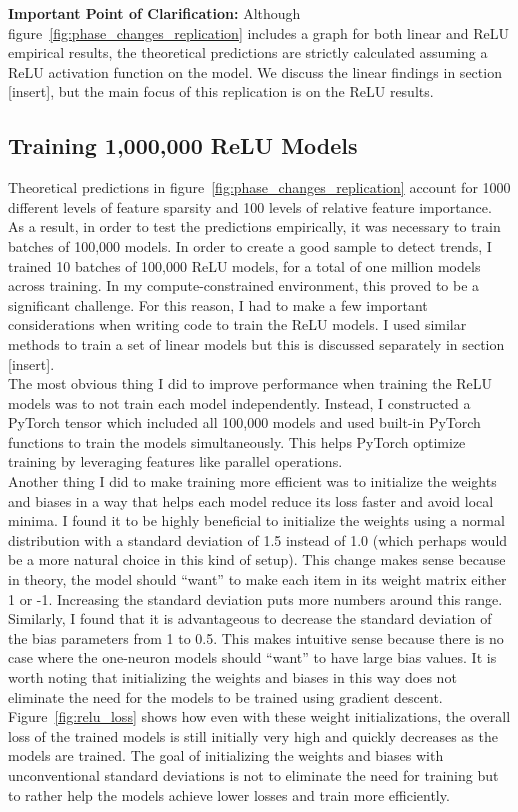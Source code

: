\documentclass{article} %
\begin{document}
\textbf{Important Point of Clarification:} Although 
figure~\ref{fig:phase_changes_replication} includes a graph for both linear and ReLU
empirical results, the theoretical predictions are strictly calculated assuming
a ReLU activation function on the model. We discuss the linear findings in section
[insert], but the main focus of this replication is on the ReLU results.

\subsection{Training 1,000,000 ReLU Models}

Theoretical predictions in figure~\ref{fig:phase_changes_replication} account
for 1000 different levels of feature sparsity and 100 levels of relative feature
importance. As a result, in order to test the predictions empirically, it was
necessary to train batches of 100,000 models. In order to create a good sample
to detect trends, I trained 10 batches of 100,000 ReLU models, for a total of one million
models across training. In my compute-constrained environment,
this proved to be a significant challenge. For this reason, I had to make a few
important considerations when writing code to train the ReLU models. I used 
similar methods to train a set of linear models but this is discussed separately
in section [insert].\\

The most obvious thing I did to improve performance when training the 
ReLU models was to not train each model independently. Instead, I constructed a 
PyTorch tensor which included all 100,000 models and used built-in PyTorch functions 
to train the models simultaneously. This helps PyTorch optimize training by 
leveraging features like parallel operations. \\

Another thing I did to make training more efficient was to initialize the weights and
biases in a way that helps each model reduce its loss faster and avoid local minima.
I found it to be highly beneficial to initialize the weights using a normal 
distribution with a standard deviation of 1.5 instead of
1.0 (which perhaps would be a more natural choice in this kind of setup). This change
makes sense because 
in theory, the model should ``want'' to make each item in its weight matrix
either 1 or -1. Increasing the standard deviation puts more numbers around this range.
Similarly, I found that it is advantageous to decrease the standard deviation of the
bias parameters from 1 to 0.5. This makes intuitive sense because
there is no case where the one-neuron models should ``want'' to have large bias values.
It is worth noting that initializing the weights and biases in this way does
not eliminate the need for the models to be trained using gradient descent.
Figure~\ref{fig:relu_loss} shows how even with these weight initializations, the
overall loss of the trained models is still initially very high and quickly
decreases as the models are trained. The goal of initializing the weights and biases
with unconventional standard deviations is not to eliminate the need for training
but to rather help the models achieve lower losses and train more efficiently.
\end{document}
